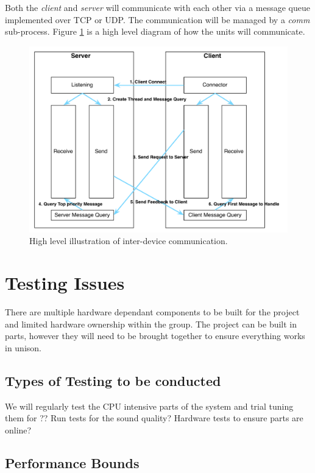 \documentclass[11pt,a4paper,titlepage]{report}
\begin{document}
Both the \textit{client} and \textit{server} will communicate with each other via a message queue implemented over TCP or UDP. The communication will be managed by a \textit{comm} sub-process. Figure \ref{fig:comm} is a high level diagram of how the units will communicate.

\begin{figure}
\centering
\includegraphics[width=1.0\textwidth]{graphs/comm.pdf}
\caption{High level illustration of inter-device communication.}
\label{fig:comm}
\end{figure}


\section{Testing Issues}

There are multiple hardware dependant components to be built for the project and limited hardware ownership within the group. The project can be built in parts, however they will need to be brought together to ensure everything works in unison. 

\subsection{Types of Testing to be conducted}

{\color{red} 

We will regularly test the CPU intensive parts of the system and trial tuning them for ?? Run tests for the sound quality? Hardware tests to ensure parts are online?

}


\subsection{Performance Bounds}
\end{document}
